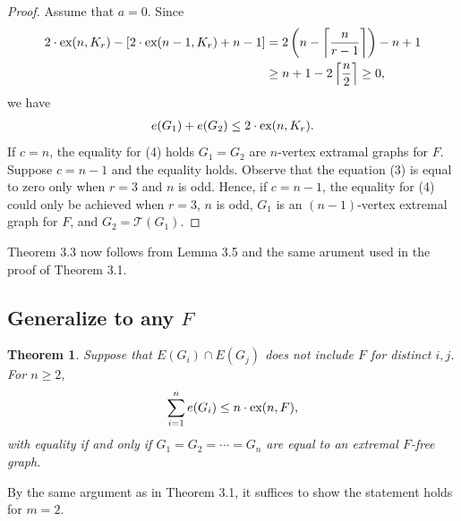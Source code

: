 \documentclass[a4paper]{article}
\newtheorem{theorem}{Theorem}[section]
\begin{document}
\begin{proof}
  Assume that $a = 0$. Since
  \begin{align}
    2 \cdot \textnormal{ex}(n, K_r) - [2 \cdot \textnormal{ex}(n - 1, K_r) + n - 1]
    &= 2\left(n - \left\lceil \frac{n}{r - 1} \right\rceil\right) - n + 1 \\
    &\geq n + 1 - 2\left\lceil \frac{n}{2} \right\rceil \geq 0, \nonumber
  \end{align}
  we have
  \begin{gather}
    e(G_1) + e(G_2) \leq 2 \cdot \textnormal{ex}(n, K_r).
  \end{gather}
  If $c = n$, the equality for (4) holds $G_1 = G_2$ are $n$-vertex extramal graphs for $F$. Suppose
  $c = n - 1$ and the equality holds. Observe that the equation (3) is equal to zero only when $r =
  3$ and $n$ is odd. Hence, if $c = n - 1$, the equality for (4) could only be achieved when $r =
  3$, $n$ is odd, $G_1$ is an $(n - 1)$-vertex extremal graph for $F$, and $G_2 = \mathcal{T}(G_1)$.
\end{proof}

Theorem 3.3 now follows from Lemma 3.5 and the same arument used in the proof of Theorem 3.1.

\subsection{Generalize to any $F$}

\begin{theorem}
  Suppose that $E(G_i) \cap E(G_j)$ does not include $F$ for distinct $i, j$. For $n \geq 2$,
  \[
    \sum_{i = 1}^n e(G_i) \leq n \cdot \textnormal{ex}(n, F),
  \]
  with equality if and only if $G_1 = G_2 = \cdots = G_n$ are equal to an extremal $F$-free graph.
\end{theorem}

By the same argument as in Theorem 3.1, it suffices to show the statement holds for $m = 2$. 
\end{document}
